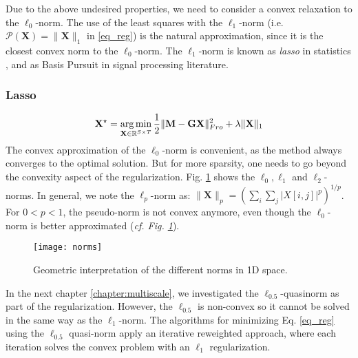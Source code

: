 Due to the above undesired properties, we need to consider a convex relaxation to the $\ell_0$-norm. The use of the least squares with the $\ell_1$-norm (i.e. $\mathcal{P}(\mathbf{X})=\|\mathbf{X}\|_1$ in \ref{eq_reg}) is the natural approximation, since it is the closest convex norm to the $\ell_0$-norm. The $\ell_1$-norm is known as \textit{lasso} in statistics \cite{tibshirani1996regression}, and as Basis Pursuit \cite{chen2001atomic} in signal processing literature.

\adjustwidth{1em}{0pt}
\subsubsection*{Lasso}
\begin{equation} \label{eq_lasso}
	\mathbf{X}^\star = \mathop{\mathrm{arg}\,\mathrm{min}}_{\mathbf{X}\in\mathbb{R}^{S\times T}}\frac{1}{2}\|\mathbf{M}-\mathbf{GX}\|_{Fro}^2 + \lambda\|\mathbf{X}\|_1
\end{equation}
\endadjustwidth
The convex approximation of the $\ell_0$-norm is convenient, as the method always converges to the optimal solution. But for more sparsity, one needs to go beyond the convexity aspect of the regularization. Fig. \ref{fig:norms} shows the $\ell_0, \ell_1$ and $\ell_2$-norms. In general, we note the $\ell_p$-norm as: $\|\mathbf{X}\|_p=(\sum_{i}\sum_j|X[i,j]|^p)^{1/p}$. For $0<p<1$, the pseudo-norm is not convex anymore, even though the $\ell_0$-norm is better approximated (\textit{cf. Fig. \ref{fig:norms}}).
\begin{figure}
\centering
	\texttt{[image: norms]}
    \caption{Geometric interpretation of the different norms in 1D space.}
	\label{fig:norms}
\end{figure}

In the next chapter \ref{chapter:multiscale}, we investigated the $\ell_{0.5}$-quasinorm as part of the regularization. However, the $\ell_{0.5}$ is non-convex so it cannot be solved in the same way as the $\ell_1$-norm. The algorithms for minimizing Eq. \ref{eq_reg} using the $\ell_{0.5}$ quasi-norm apply an iterative reweighted approach, where each iteration solves the convex problem with an $\ell_1$ regularization.
\adjustwidth{1em}{0pt}


